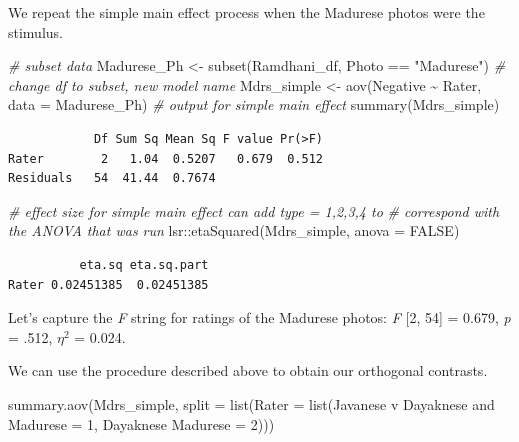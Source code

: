 \documentclass[
  11pt,
]{book}
\newenvironment{Shaded}{\begin{snugshade}}{\end{snugshade}}
\newcommand{\AttributeTok}[1]{\textcolor[rgb]{0.77,0.63,0.00}{#1}}
\newcommand{\CommentTok}[1]{\textcolor[rgb]{0.56,0.35,0.01}{\textit{#1}}}
\newcommand{\ConstantTok}[1]{\textcolor[rgb]{0.00,0.00,0.00}{#1}}
\newcommand{\DecValTok}[1]{\textcolor[rgb]{0.00,0.00,0.81}{#1}}
\newcommand{\FunctionTok}[1]{\textcolor[rgb]{0.00,0.00,0.00}{#1}}
\newcommand{\NormalTok}[1]{#1}
\newcommand{\OtherTok}[1]{\textcolor[rgb]{0.56,0.35,0.01}{#1}}
\newcommand{\SpecialCharTok}[1]{\textcolor[rgb]{0.00,0.00,0.00}{#1}}
\newcommand{\StringTok}[1]{\textcolor[rgb]{0.31,0.60,0.02}{#1}}
\begin{document}
We repeat the simple main effect process when the Madurese photos were the stimulus.

\begin{Shaded}
\begin{Highlighting}[]
\CommentTok{\# subset data}
\NormalTok{Madurese\_Ph }\OtherTok{\textless{}{-}} \FunctionTok{subset}\NormalTok{(Ramdhani\_df, Photo }\SpecialCharTok{==} \StringTok{"Madurese"}\NormalTok{)}
\CommentTok{\# change df to subset, new model name}
\NormalTok{Mdrs\_simple }\OtherTok{\textless{}{-}} \FunctionTok{aov}\NormalTok{(Negative }\SpecialCharTok{\textasciitilde{}}\NormalTok{ Rater, }\AttributeTok{data =}\NormalTok{ Madurese\_Ph)}
\CommentTok{\# output for simple main effect}
\FunctionTok{summary}\NormalTok{(Mdrs\_simple)}
\end{Highlighting}
\end{Shaded}

\begin{verbatim}
            Df Sum Sq Mean Sq F value Pr(>F)
Rater        2   1.04  0.5207   0.679  0.512
Residuals   54  41.44  0.7674               
\end{verbatim}

\begin{Shaded}
\begin{Highlighting}[]
\CommentTok{\# effect size for simple main effect can add \textquotesingle{}type = 1,2,3,4\textquotesingle{} to}
\CommentTok{\# correspond with the ANOVA that was run}
\NormalTok{lsr}\SpecialCharTok{::}\FunctionTok{etaSquared}\NormalTok{(Mdrs\_simple, }\AttributeTok{anova =} \ConstantTok{FALSE}\NormalTok{)}
\end{Highlighting}
\end{Shaded}

\begin{verbatim}
          eta.sq eta.sq.part
Rater 0.02451385  0.02451385
\end{verbatim}

Let's capture the \emph{F} string for ratings of the Madurese photos: \emph{F} {[}2, 54{]} = 0.679, \emph{p} = .512, \(\eta ^{2}\) = 0.024.

We can use the procedure described above to obtain our orthogonal contrasts.

\begin{Shaded}
\begin{Highlighting}[]
\FunctionTok{summary.aov}\NormalTok{(Mdrs\_simple, }\AttributeTok{split =} \FunctionTok{list}\NormalTok{(}\AttributeTok{Rater =} \FunctionTok{list}\NormalTok{(}\StringTok{\textasciigrave{}}\AttributeTok{Javanese v Dayaknese and Madurese}\StringTok{\textasciigrave{}} \OtherTok{=} \DecValTok{1}\NormalTok{,}
    \StringTok{\textasciigrave{}}\AttributeTok{Dayaknese Madurese}\StringTok{\textasciigrave{}} \OtherTok{=} \DecValTok{2}\NormalTok{)))}
\end{Highlighting}
\end{Shaded}
\end{document}
